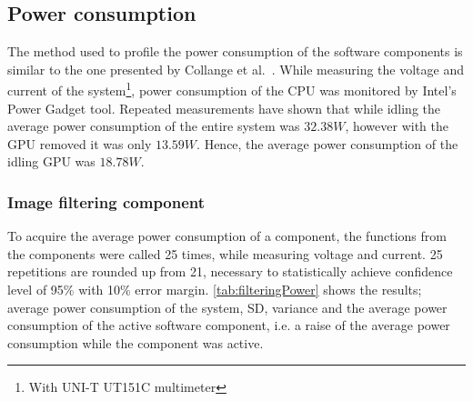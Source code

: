 \documentclass{sig-alternate}
\begin{document}
\subsection{Power consumption}

The method used to profile the power consumption of the software components is similar to the one presented by Collange et al.~\cite{Collange2009}. While measuring the voltage and current of the system\footnote{With UNI-T UT151C multimeter}, power consumption of the CPU was monitored by Intel's Power Gadget tool. Repeated measurements have shown that while idling the average power consumption of the entire system was $32.38W$, however with the GPU removed it was only $13.59W$. Hence, the average power consumption of the idling GPU was $18.78W$.

\subsubsection*{Image filtering component}

To acquire the average power consumption of a component, the functions from the components were called 25 times, while  measuring voltage and current. 25 repetitions are rounded up from 21, necessary to statistically achieve confidence level of 95\% with 10\% error margin.
 \autoref{tab:filteringPower} shows the results; average power consumption of the system, SD, variance and the average power consumption of the active software component, i.e. a raise of the average power consumption while the component was active. 
\end{document}
